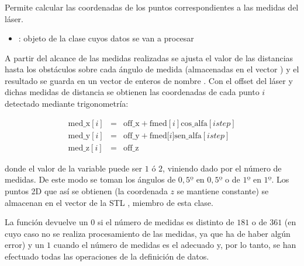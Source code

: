 \subsubsection {}


\noindent
Permite calcular las coordenadas de los puntos correspondientes a las medidas del láser.

\begin{itemize}
  \item {}: objeto de la clase  cuyos datos se van a procesar
\end{itemize}

\noindent
A partir del alcance de las medidas realizadas se ajusta el valor de las distancias hasta los obstáculos sobre cada ángulo de medida (almacenadas en el vector ) y el resultado se guarda en un vector de enteros de nombre .
\noindent
Con el offset del láser y dichas medidas de distancia se obtienen las coordenadas de cada punto $i$ detectado mediante trigonometría:

\begin{eqnarray*}
\mbox{med\_x}[i] &= &\mbox{off\_x}+\mbox{fmed}[i]\mbox{cos\_alfa}[istep] \\
\mbox{med\_y}[i] &= &\mbox{off\_y}+\mbox{fmed[}i]\mbox{sen\_alfa}[istep] \\
\mbox{med\_z}[i] &= &\mbox{off\_z}
\end{eqnarray*}

\noindent
donde el valor de la variable  puede ser $1$ ó $2$, viniendo dado por el número de medidas. De este modo se toman los ángulos de $0,5º$ en $0,5º$ o de $1º$ en $1º$.
\noindent
Los puntos 2D que así se obtienen (la coordenada $z$ se mantiene constante) se almacenan en el vector de la STL , miembro de esta clase.

La función devuelve un $0$ si el número de medidas es distinto de $181$ o de $361$ (en cuyo caso no se realiza procesamiento de las medidas, ya que ha de haber algún error) y un $1$ cuando el número de medidas es el adecuado y, por lo tanto, se han efectuado todas las operaciones de la definición de datos.

%
%
%
%

